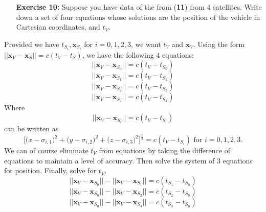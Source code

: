 \documentclass[11pt]{article}
\theoremstyle{definition}
\newcommand{\1}[1]{\mathbf{1} \left \{ #1 \right \}}
\begin{document}
\begin{itemize}
\item[{\textbf{Exercise 10:}}] Suppose you have data of the from (\textbf{11}) from $4$ satellites.  Write down a set of four equations whose solutions are the position of the vehicle in Cartesian coordinates, and $t_V$.
\end{itemize}
Provided we have $t_{S_i}, \textbf{x}_{S_i}$ for $i = 0,1,2,3$, we want $t_V$ and $\textbf{x}_V$.  Using the form \(||\textbf{x}_V - \textbf{x}_S|| = c(t_V - t_S)\), we have the following $4$ equations:
\begin{equation}
    ||\textbf{x}_V - \textbf{x}_{S_0}|| = c(t_V - t_{S_0})
\end{equation}
\begin{equation}
    ||\textbf{x}_V - \textbf{x}_{S_1}|| = c(t_V - t_{S_1})
\end{equation}
\begin{equation}
    ||\textbf{x}_V - \textbf{x}_{S_2}|| = c(t_V - t_{S_2})
\end{equation}
\begin{equation}
    ||\textbf{x}_V - \textbf{x}_{S_3}|| = c(t_V - t_{S_3})
\end{equation}
Where
\begin{equation}
    ||\textbf{x}_V - \textbf{x}_{S_i}|| = c(t_V - t_{S_i})
\end{equation} can be written as
\begin{equation}
    \Big[\big(x - \sigma_{i,1}\big)^2 + \big(y - \sigma_{i,2}\big)^2 + \big(z - \sigma_{i,3}\big)^2\Big]^{\frac{1}{2}} = c(t_V - t_{S_i}) \text{ for } i = 0,1,2,3.
\end{equation}
We can of course eliminate $t_V$ from equations by taking the difference of equations to maintain a level of accuracy.  Then solve the system of 3 equations for position.  Finally, solve for $t_V$.
\begin{equation}
    ||\textbf{x}_V - \textbf{x}_{S_0}|| - ||\textbf{x}_V - \textbf{x}_{S_1}|| = c(t_{S_1} - t_{S_0})
\end{equation}
\begin{equation}
    ||\textbf{x}_V - \textbf{x}_{S_0}|| - ||\textbf{x}_V - \textbf{x}_{S_2}|| = c(t_{S_2} - t_{S_0})
\end{equation}
\begin{equation}
    ||\textbf{x}_V - \textbf{x}_{S_0}|| - ||\textbf{x}_V - \textbf{x}_{S_3}|| = c(t_{S_3} - t_{S_0})
\end{equation}
\end{document}
